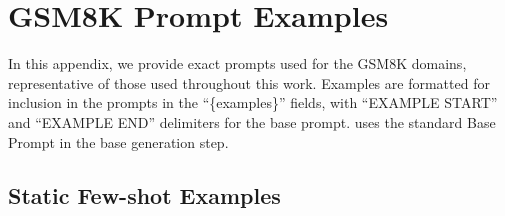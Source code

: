 \section{GSM8K Prompt Examples}
\label{appendix_prompts}

In this appendix, we provide exact prompts used for the GSM8K domains, representative of those used throughout this work. Examples are formatted for inclusion in the prompts in the ``\{examples\}'' fields, with ``EXAMPLE START'' and ``EXAMPLE END'' delimiters for the base prompt. \Sys{} uses the standard Base Prompt in the base generation step.

\subsection*{Static Few-shot Examples}











